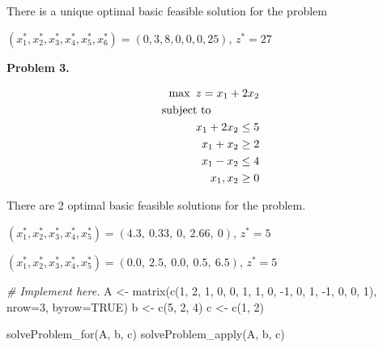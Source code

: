 \documentclass[
]{article}
\newenvironment{Shaded}{\begin{snugshade}}{\end{snugshade}}
\newcommand{\AttributeTok}[1]{\textcolor[rgb]{0.77,0.63,0.00}{#1}}
\newcommand{\CommentTok}[1]{\textcolor[rgb]{0.56,0.35,0.01}{\textit{#1}}}
\newcommand{\ConstantTok}[1]{\textcolor[rgb]{0.00,0.00,0.00}{#1}}
\newcommand{\DecValTok}[1]{\textcolor[rgb]{0.00,0.00,0.81}{#1}}
\newcommand{\FunctionTok}[1]{\textcolor[rgb]{0.00,0.00,0.00}{#1}}
\newcommand{\NormalTok}[1]{#1}
\newcommand{\OtherTok}[1]{\textcolor[rgb]{0.56,0.35,0.01}{#1}}
\newcommand{\SpecialCharTok}[1]{\textcolor[rgb]{0.00,0.00,0.00}{#1}}
\begin{document}
There is a unique optimal basic feasible solution for the problem

\((x^*_1, x^*_2, x^*_3, x^*_4, x^*_5, x^*_6)=(0, 3, 8, 0, 0, 0, 25)\),
\(z^*=27\)

\textbf{Problem 3.}

\vspace{-0.5cm}

\begin{eqnarray*}
\max\ z=x_{1}+2x_{2}\\
\mbox{subject to}\hspace{1.5cm}\\
x_{1}+2x_{2}\leq 5\\
x_{1}+x_{2}\geq 2\\
x_{1}-x_{2}\leq 4 \\
x_{1},x_{2}\geq 0\\
\end{eqnarray*}

There are 2 optimal basic feasible solutions for the problem.

\((x^*_1, x^*_2, x^*_3, x^*_4, x^*_5)=(4.3,\ 0.33,\ 0,\ 2.66,\ 0)\),
\(z^*= 5\)

\((x^*_1, x^*_2, x^*_3, x^*_4, x^*_5)=(0.0,\  2.5,\  0.0,\  0.5,\  6.5)\),
\(z^*= 5\)

\begin{Shaded}
\begin{Highlighting}[]
\CommentTok{\# Implement here.}
\NormalTok{A }\OtherTok{\textless{}{-}} \FunctionTok{matrix}\NormalTok{(}\FunctionTok{c}\NormalTok{(}\DecValTok{1}\NormalTok{, }\DecValTok{2}\NormalTok{, }\DecValTok{1}\NormalTok{, }\DecValTok{0}\NormalTok{, }\DecValTok{0}\NormalTok{, }\DecValTok{1}\NormalTok{, }\DecValTok{1}\NormalTok{, }\DecValTok{0}\NormalTok{, }\SpecialCharTok{{-}}\DecValTok{1}\NormalTok{, }\DecValTok{0}\NormalTok{, }\DecValTok{1}\NormalTok{, }\SpecialCharTok{{-}}\DecValTok{1}\NormalTok{, }\DecValTok{0}\NormalTok{, }\DecValTok{0}\NormalTok{, }\DecValTok{1}\NormalTok{), }\AttributeTok{nrow=}\DecValTok{3}\NormalTok{, }\AttributeTok{byrow=}\ConstantTok{TRUE}\NormalTok{)}
\NormalTok{b }\OtherTok{\textless{}{-}} \FunctionTok{c}\NormalTok{(}\DecValTok{5}\NormalTok{, }\DecValTok{2}\NormalTok{, }\DecValTok{4}\NormalTok{)}
\NormalTok{c }\OtherTok{\textless{}{-}} \FunctionTok{c}\NormalTok{(}\DecValTok{1}\NormalTok{, }\DecValTok{2}\NormalTok{)}

\FunctionTok{solveProblem\_for}\NormalTok{(A, b, c)}
\FunctionTok{solveProblem\_apply}\NormalTok{(A, b, c)}
\end{Highlighting}
\end{Shaded}
\end{document}

